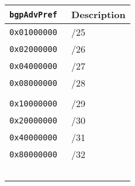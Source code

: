 \documentclass[documentation]{subfiles}
\begin{document}
\begin{minipage}{0.3\textwidth}
    \begin{longtable}{>{\tt}rl}
        \toprule
        {\bf bgpAdvPref} & {\bf Description}\\
        \midrule\endhead%
        0x01000000 & /25 \\
        0x02000000 & /26 \\
        0x04000000 & /27 \\
        0x08000000 & /28 \\
        \\
        0x10000000 & /29 \\
        0x20000000 & /30 \\
        0x40000000 & /31 \\
        0x80000000 & /32 \\
        \\
        \\
        \\
        \\
        \\
        \bottomrule
    \end{longtable}
\end{minipage}
\end{document}
